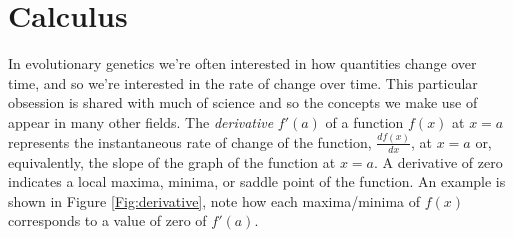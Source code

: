 

\section{Calculus} \label{section:calculus}
In evolutionary genetics we're often interested in how quantities
change over time, and so we're interested in the rate of change over
time. This particular obsession is shared with much of
science and so the concepts we make use of appear in many other fields. 
The \emph{derivative} $f'(a)$ of a function $f(x)$ at $x=a$ represents
the instantaneous rate of change of the function, $\frac{df(x)}{dx}$, at $x=a$ or,
equivalently, the slope of the graph of the function at $x=a$. A
derivative of zero indicates a local maxima, minima, or saddle point
of the function. An example is shown in Figure \ref{Fig:derivative},
note how each maxima/minima of $f(x)$ corresponds to a value of zero
of $f'(a)$.
    
